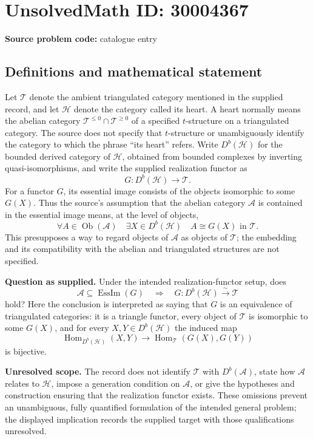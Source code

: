 \documentclass[11pt]{article}
\begin{document}
\section*{UnsolvedMath ID: 30004367}
\textbf{Source problem code:} catalogue entry
\subsection{Definitions and mathematical statement}
Let \(\mathcal T\) denote the ambient triangulated category mentioned in the supplied record, and let \(\mathcal H\) denote the category called its heart. A heart normally means the abelian category \(\mathcal T^{\leq 0}\cap\mathcal T^{\geq 0}\) of a specified \(t\)-structure on a triangulated category. The source does not specify that \(t\)-structure or unambiguously identify the category to which the phrase ``its heart'' refers. Write \(D^b(\mathcal H)\) for the bounded derived category of \(\mathcal H\), obtained from bounded complexes by inverting quasi-isomorphisms, and write the supplied realization functor as
\[
G\colon D^b(\mathcal H)\longrightarrow\mathcal T.
\]
For a functor \(G\), its essential image consists of the objects isomorphic to some \(G(X)\). Thus the source's assumption that the abelian category \(\mathcal A\) is contained in the essential image means, at the level of objects,
\[
\forall A\in\operatorname{Ob}(\mathcal A)\quad
\exists X\in D^b(\mathcal H)\quad A\cong G(X)\text{ in }\mathcal T.
\]
This presupposes a way to regard objects of \(\mathcal A\) as objects of \(\mathcal T\); the embedding and its compatibility with the abelian and triangulated structures are not specified.

\textbf{Question as supplied.} Under the intended realization-functor setup, does
\[
\mathcal A\subseteq\operatorname{EssIm}(G)
\quad\Longrightarrow\quad
G\colon D^b(\mathcal H)\xrightarrow{\sim}\mathcal T
\]
hold? Here the conclusion is interpreted as saying that \(G\) is an equivalence of triangulated categories: it is a triangle functor, every object of \(\mathcal T\) is isomorphic to some \(G(X)\), and for every \(X,Y\in D^b(\mathcal H)\) the induced map
\[
\operatorname{Hom}_{D^b(\mathcal H)}(X,Y)
\longrightarrow
\operatorname{Hom}_{\mathcal T}(G(X),G(Y))
\]
is bijective.

\textbf{Unresolved scope.} The record does not identify \(\mathcal T\) with \(D^b(\mathcal A)\), state how \(\mathcal A\) relates to \(\mathcal H\), impose a generation condition on \(\mathcal A\), or give the hypotheses and construction ensuring that the realization functor exists. These omissions prevent an unambiguous, fully quantified formulation of the intended general problem; the displayed implication records the supplied target with those qualifications unresolved.
\end{document}
